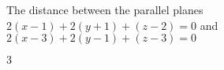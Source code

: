 {The distance between the parallel planes\\
$2(x-1)+2(y+1)+(z-2)=0$ and \\
$2(x-3)+2(y-1)+(z-3)=0$

}
{$3$
}

